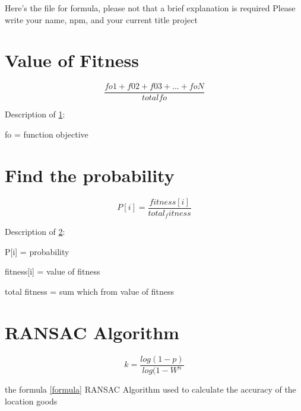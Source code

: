 Here's the file for formula, please not that a brief explanation is required
Please write your name, npm, and your current title project

\section{Value of Fitness}
    \label{fitness}
    \begin{equation}
        \frac{fo1 + f02 + f03 + ... + foN}{total fo}
    \end{equation}
    \par Description of \ref{fitness}:
    \par fo = function objective

\section{Find the probability}
    \label{ptobabilty}
    \begin{equation}
        P[i] = \frac{fitness[i]}{total_fitness}
    \end{equation}
    \par Description of \ref{ptobabilty}:
    \par P[i] = probability
    \par fitness[i] = value of fitness
    \par total fitness = sum which from value of fitness

\section{RANSAC Algorithm}
    \label{Formula}
    \begin{equation}
        k = \frac{log(1-p)}{log(1-W^n}
    \end{equation}

    the formula \ref{formula} RANSAC Algorithm used to calculate the accuracy of the location goods
